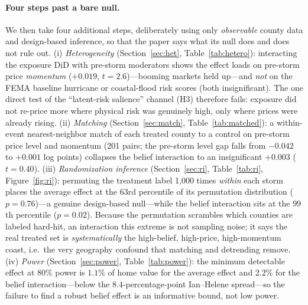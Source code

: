 \documentclass[12pt]{article}
\begin{document}
\paragraph{Four steps past a bare null.} We then take four additional steps, deliberately using
only \emph{observable} county data and design-based inference, so that the paper says what its
null does and does not rule out. (i) \emph{Heterogeneity} (Section~\ref{sec:het},
Table~\ref{tab:hetero}): interacting the exposure DiD with pre-storm moderators shows the effect
loads on pre-storm price \emph{momentum} ($+0.019$, $t=2.6$)---booming markets held up---and
\emph{not} on the FEMA baseline hurricane or coastal-flood risk scores (both insignificant). The
one direct test of the ``latent-risk salience'' channel (H3) therefore fails: exposure did not
re-price more where physical risk was genuinely high, only where prices were already rising.
(ii) \emph{Matching} (Section~\ref{sec:match}, Table~\ref{tab:matched}): a within-event
nearest-neighbor match of each treated county to a control on pre-storm price level and momentum
(201 pairs; the pre-storm level gap falls from $-0.042$ to $+0.001$ log points) collapses the
belief interaction to an insignificant $+0.003$ ($t=0.40$). (iii) \emph{Randomization inference}
(Section~\ref{sec:ri}, Table~\ref{tab:ri}, Figure~\ref{fig:ri}): permuting the treatment label
1{,}000 times \emph{within} each storm places the average effect at the $63$rd percentile of its
permutation distribution ($p=0.76$)---a genuine design-based null---while the belief interaction
sits at the $99$th percentile ($p=0.02$). Because the permutation scrambles which counties are
labeled hard-hit, an interaction this extreme is not sampling noise; it says the real treated set
is \emph{systematically} the high-belief, high-price, high-momentum coast, i.e.\ the very
geography confound that matching and detrending remove. (iv) \emph{Power}
(Section~\ref{sec:power}, Table~\ref{tab:power}): the minimum detectable effect at 80\% power is
$1.1\%$ of home value for the average effect and $2.2\%$ for the belief interaction---below the
$8.4$-percentage-point Ian--Helene spread---so the failure to find a robust belief effect is an
informative bound, not low power.
\end{document}
